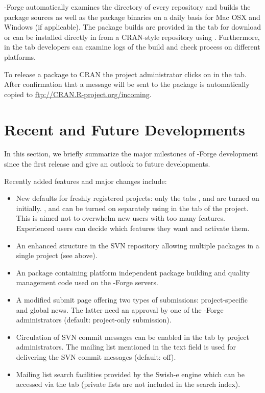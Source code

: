\R{}-Forge automatically examines the  directory of
every repository and builds the package sources as well as the package
binaries on a daily basis for Mac OSX and Windows (if applicable). The
package builds 
are provided in the  tab for download or can be
installed directly in \R{} from a CRAN-style repository using 
. Furthermore, in the  tab developers can examine logs of the build and check
process on different platforms. 

To release a package to CRAN the project administrator clicks on
 in the  tab. After
confirmation that a message will be sent to 
the package is automatically copied to
\url{ftp://CRAN.R-project.org/incoming}.

\section*{Recent and Future Developments}

In this section, we briefly summarize the major milestones of
\R{}-Forge development since the first release and give an outlook to
future developments.

Recently added features and major changes include:

\begin{itemize}
\item New defaults for freshly registered projects: only the tabs
  ,  and  are turned on
  initially. ,  and 
  can be turned on separately using  in
  the  tab of the project. This is aimed not to overwhelm
  new users with too many features. Experienced users can decide
  which features they want and activate them.
\item An enhanced structure in the SVN repository allowing multiple
  packages in a single project (see above).
\item An \R{} package \citep[,
  see][]{forge:theussl:2008} containing platform independent package
  building and quality management code used on the \R{}-Forge servers.
\item A modified  submit page offering two types of
  submissions: project-specific and global news. The latter
  need an approval by one of the \R{}-Forge administrators (default:
  project-only submission).
\item Circulation of SVN commit messages can be enabled in the
   tab by project administrators. The mailing list mentioned in
  the text field is used for delivering the SVN commit messages
  (default: off). 
\item Mailing list search facilities provided by the Swish-e engine
  which can be accessed via the  tab (private lists
  are not included in the search index).

\end{itemize}

